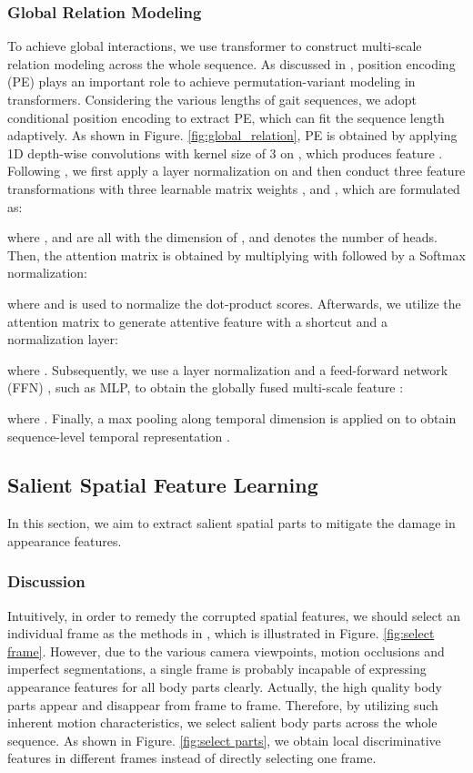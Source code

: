 \documentclass[journal]{IEEEtran}
\begin{document}
\subsubsection{Global Relation Modeling}
 To achieve global interactions, we use transformer to construct multi-scale relation modeling across the whole sequence. As discussed in \cite{transformer, vit, swin}, position encoding (PE) plays an important role to achieve permutation-variant modeling in transformers. Considering the various lengths of gait sequences, we adopt conditional position encoding\cite{CondTrans} to extract PE, which can fit the sequence length adaptively. As shown in Figure. \ref{fig:global_relation}, PE is obtained by applying 1D depth-wise convolutions with kernel size of 3 on , which produces feature . Following \cite{transformer}, we first apply a layer normalization on  and then conduct three feature transformations with three learnable matrix weights ,  and , which are formulated as:

 
 where ,  and  are all with the dimension of , and  denotes the number of heads. Then, the attention matrix is obtained by multiplying  with  followed by a Softmax normalization:
 
 where  and  is used to normalize the dot-product scores. Afterwards, we utilize the attention matrix  to generate attentive feature  with a shortcut and a normalization layer:
 
 where . Subsequently, we use a layer normalization and a feed-forward network (FFN) \cite{transformer}, such as MLP, to obtain the globally fused multi-scale feature :
 
 where . Finally, a max pooling along temporal dimension is applied on  to obtain sequence-level temporal representation .
 


 \subsection{Salient Spatial Feature Learning}
In this section, we aim to extract salient spatial parts to mitigate the damage in appearance features.
 \subsubsection{Discussion} Intuitively, in order to remedy the corrupted spatial features, we should select an individual frame as the methods in \cite{gowda2020smart, kopuklu2019you}, which is illustrated in Figure. \ref{fig:select frame}. However, due to the various camera viewpoints, motion occlusions and imperfect segmentations, a single frame is probably incapable of expressing appearance features for all body parts clearly. Actually, the high quality body parts appear and disappear from frame to frame. Therefore, by utilizing such inherent motion characteristics, we select salient body parts across the whole sequence. As shown in Figure. \ref{fig:select parts}, we obtain local discriminative features in different frames instead of directly selecting one frame.
 
\end{document}
